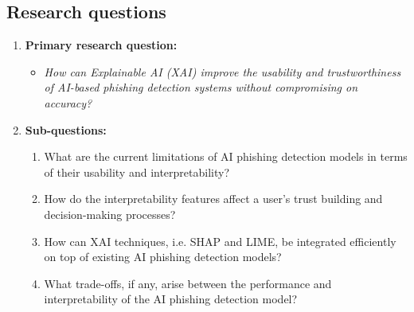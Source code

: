 \subsection*{Research questions}

\begin{enumerate}
  \item \textbf{Primary research question:}
    \begin{itemize}
      \item \textit{How can Explainable AI (XAI) improve the usability and trustworthiness of AI-based phishing detection systems without compromising on accuracy?}
    \end{itemize}
  \item \textbf{Sub-questions:}
    \begin{enumerate}
      \item What are the current limitations of AI phishing detection models in terms of their usability and interpretability?
      \item How do the interpretability features affect a user's trust building and decision-making processes?
      \item How can XAI techniques, i.e. SHAP and LIME, be integrated efficiently on top of existing AI phishing detection models?
      \item What trade-offs, if any, arise between the performance and interpretability of the AI phishing detection model?
    \end{enumerate}
\end{enumerate}


